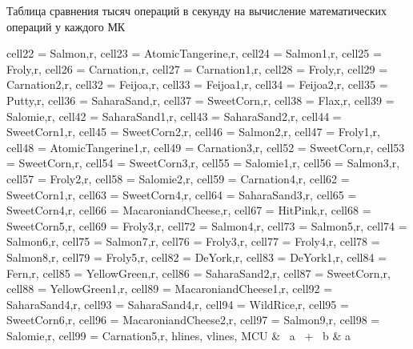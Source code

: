 
\begin{table}[H]
	\centering
	\caption{Таблица сравнения тысяч операций в секунду на вычисление математических операций у каждого МК}\label{TestTimeT2}

	\begin{adjustbox}{width=\textwidth}

		\begin{tblr}{
				cell{2}{2} = {Salmon,r},
				cell{2}{3} = {AtomicTangerine,r},
				cell{2}{4} = {Salmon1,r},
				cell{2}{5} = {Froly,r},
				cell{2}{6} = {Carnation,r},
				cell{2}{7} = {Carnation1,r},
				cell{2}{8} = {Froly,r},
				cell{2}{9} = {Carnation2,r},
				cell{3}{2} = {Feijoa,r},
				cell{3}{3} = {Feijoa1,r},
				cell{3}{4} = {Feijoa2,r},
				cell{3}{5} = {Putty,r},
				cell{3}{6} = {SaharaSand,r},
				cell{3}{7} = {SweetCorn,r},
				cell{3}{8} = {Flax,r},
				cell{3}{9} = {Salomie,r},
				cell{4}{2} = {SaharaSand1,r},
				cell{4}{3} = {SaharaSand2,r},
				cell{4}{4} = {SweetCorn1,r},
				cell{4}{5} = {SweetCorn2,r},
				cell{4}{6} = {Salmon2,r},
				cell{4}{7} = {Froly1,r},
				cell{4}{8} = {AtomicTangerine1,r},
				cell{4}{9} = {Carnation3,r},
				cell{5}{2} = {SweetCorn,r},
				cell{5}{3} = {SweetCorn,r},
				cell{5}{4} = {SweetCorn3,r},
				cell{5}{5} = {Salomie1,r},
				cell{5}{6} = {Salmon3,r},
				cell{5}{7} = {Froly2,r},
				cell{5}{8} = {Salomie2,r},
				cell{5}{9} = {Carnation4,r},
				cell{6}{2} = {SweetCorn1,r},
				cell{6}{3} = {SweetCorn4,r},
				cell{6}{4} = {SaharaSand3,r},
				cell{6}{5} = {SweetCorn4,r},
				cell{6}{6} = {MacaroniandCheese,r},
				cell{6}{7} = {HitPink,r},
				cell{6}{8} = {SweetCorn5,r},
				cell{6}{9} = {Froly3,r},
				cell{7}{2} = {Salmon4,r},
				cell{7}{3} = {Salmon5,r},
				cell{7}{4} = {Salmon6,r},
				cell{7}{5} = {Salmon7,r},
				cell{7}{6} = {Froly3,r},
				cell{7}{7} = {Froly4,r},
				cell{7}{8} = {Salmon8,r},
				cell{7}{9} = {Froly5,r},
				cell{8}{2} = {DeYork,r},
				cell{8}{3} = {DeYork1,r},
				cell{8}{4} = {Fern,r},
				cell{8}{5} = {YellowGreen,r},
				cell{8}{6} = {SaharaSand2,r},
				cell{8}{7} = {SweetCorn,r},
				cell{8}{8} = {YellowGreen1,r},
				cell{8}{9} = {MacaroniandCheese1,r},
				cell{9}{2} = {SaharaSand4,r},
				cell{9}{3} = {SaharaSand4,r},
				cell{9}{4} = {WildRice,r},
				cell{9}{5} = {SweetCorn6,r},
				cell{9}{6} = {MacaroniandCheese2,r},
				cell{9}{7} = {Salmon9,r},
				cell{9}{8} = {Salomie,r},
				cell{9}{9} = {Carnation5,r},
				hlines,
				vlines,
			}
			MCU                  & ~a~
			+~ b                 & a~

\end{tblr}
\end{adjustbox}
\end{table}

